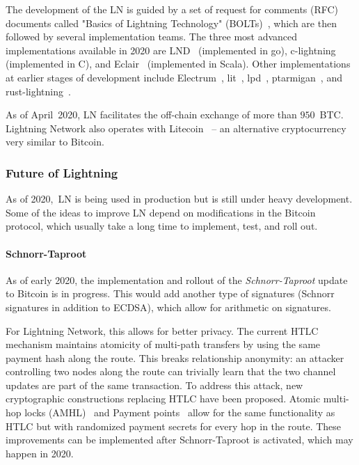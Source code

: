 
The development of the LN is guided by a set of request for comments (RFC) documents called "Basics of Lightning Technology" (BOLTs)~\cite{BOLT}, 
which are then followed by several implementation teams.
The three most advanced implementations available in 2020 are LND~\cite{LND} (implemented in go), c-lightning~\cite{clightning} (implemented in C), and Eclair~\cite{Eclair} (implemented in Scala).
Other implementations at earlier stages of development include
Electrum~\cite{ElectrumWebsite, ElectrumLightningAnnounce}, lit~\cite{lit}, lpd~\cite{lpd}, ptarmigan~\cite{ptarmigan}, and rust-lightning~\cite{rustlightning}.

As of April~2020, LN facilitates the off-chain exchange of more than $950$~BTC.
Lightning Network also operates with Litecoin~\cite{1MLLitecoin} -- an alternative cryptocurrency very similar to Bitcoin.

\subsubsection*{Future of Lightning}

As of 2020,~LN is being used in production but is still under heavy development.
Some of the ideas to improve LN depend on modifications in the Bitcoin protocol, which usually take a long time to implement, test, and roll out.

\paragraph{Schnorr-Taproot}
As of early 2020, the implementation and rollout of the \textit{Schnorr-Taproot} update to Bitcoin is in progress.
This would add another type of signatures (Schnorr signatures in addition to ECDSA), which allow for arithmetic on signatures.

For Lightning Network, this allows for better privacy.
The current HTLC mechanism maintains atomicity of multi-path transfers by using the same payment hash along the route.
This breaks relationship anonymity: an attacker controlling two nodes along the route can trivially learn that the two channel updates are part of the same transaction.
To address this attack, new cryptographic constructions replacing HTLC have been proposed.
Atomic multi-hop locks (AMHL)~\cite{Malavolta2019} and Payment points~\cite{Kohen2019} allow for the same functionality as HTLC but with randomized payment secrets for every hop in the route.
These improvements can be implemented after Schnorr-Taproot is activated, which may happen in 2020.

